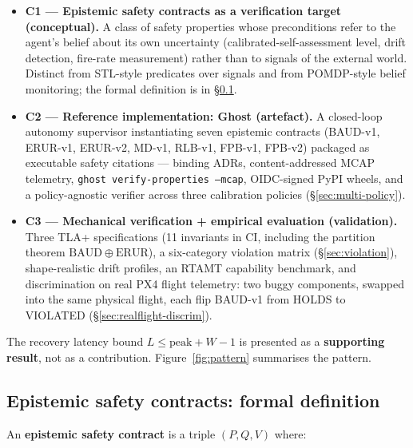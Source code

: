 \documentclass[acmsmall,nonacm=true,review=false]{acmart}
\theoremstyle{plain}
\begin{document}
\begin{itemize}
  \item \textbf{C1 --- Epistemic safety contracts as a
        verification target (conceptual).} A class of safety
        properties whose preconditions refer to the agent's
        belief about its own uncertainty
        (calibrated-self-assessment level, drift detection,
        fire-rate measurement) rather than to signals of the
        external world. Distinct from STL-style predicates over
        signals and from POMDP-style belief monitoring; the
        formal definition is in \S\ref{sec:epistemic-def}.
  \item \textbf{C2 --- Reference implementation: Ghost
        (artefact).} A closed-loop autonomy supervisor
        instantiating seven epistemic contracts (BAUD-v1, ERUR-v1,
        ERUR-v2, MD-v1, RLB-v1, FPB-v1, FPB-v2) packaged as
        executable safety
        citations --- binding ADRs, content-addressed MCAP
        telemetry, \texttt{ghost verify-properties --mcap},
        OIDC-signed PyPI wheels, and a policy-agnostic verifier
        across three calibration policies
        (\S\ref{sec:multi-policy}).
  \item \textbf{C3 --- Mechanical verification + empirical
        evaluation (validation).} Three TLA+ specifications
        (11 invariants in CI, including the partition theorem
        $\mathrm{BAUD} \oplus \mathrm{ERUR}$), a six-category
        violation matrix (\S\ref{sec:violation}), shape-realistic
        drift profiles, an RTAMT capability benchmark, and
        discrimination on real PX4 flight telemetry: two buggy
        components, swapped into the same physical flight, each
        flip BAUD-v1 from HOLDS to VIOLATED
        (\S\ref{sec:realflight-discrim}).
\end{itemize}

The recovery latency bound $L \le \mathrm{peak} + W - 1$ is
presented as a \textbf{supporting result}, not as a contribution.
Figure~\ref{fig:pattern} summarises the pattern.

\subsection{Epistemic safety contracts: formal definition}
\label{sec:epistemic-def}

An \textbf{epistemic safety contract} is a triple $(P, Q, V)$
where:
\end{document}
